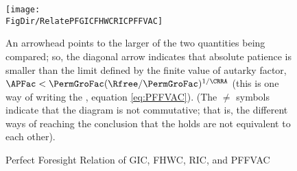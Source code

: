 \begin{figure}[ht]
  \centerline{
    \texttt{[image: \\FigDir/RelatePFGICFHWCRICPFFVAC]}
  }
  \caption{Perfect Foresight Relation of {GIC}, {FHWC}, {RIC}, and {PFFVAC}}
  \footnotesize{An arrowhead points to the larger of the two quantities being compared; so, the diagonal arrow indicates that absolute patience is smaller than the limit defined by the finite value of autarky factor, $\APFac < \PermGroFac (\Rfree/\PermGroFac)^{1/\CRRA}$ (this is one way of writing the {\PFFVAC}, equation \eqref{eq:PFFVAC}}). (The $\neq$ symbols indicate that the diagram is not commutative; that is, the different ways of reaching the conclusion that the {\PFFVAC} holds are not equivalent to each other).
\end{figure}
